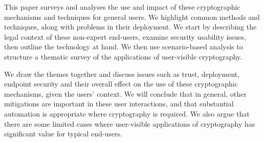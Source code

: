 \documentclass{article}
\begin{document}
This paper surveys and analyses the use and impact of these
cryptographic mechanisms and techniques for general users.
We highlight  common methods and techniques, along with  problems in their deployment.
We start by describing the legal context of these non-expert end-users, examine security usability issues, then outline the technology at hand.  
We then use scenario-based analysis to structure a thematic survey of the applications of user-visible cryptography.  

We draw the themes together and discuss issues such as trust, deployment, endpoint security and their overall effect on the use of these cryptographic mechanisms, given the users' context.
We will conclude that in general, other mitigations are important in these user interactions, and 
that substantial automation is appropriate where cryptography is required.
We also argue that there are some limited cases where user-visible applications of cryptography has 
significant value
for typical end-users.
\end{document}
